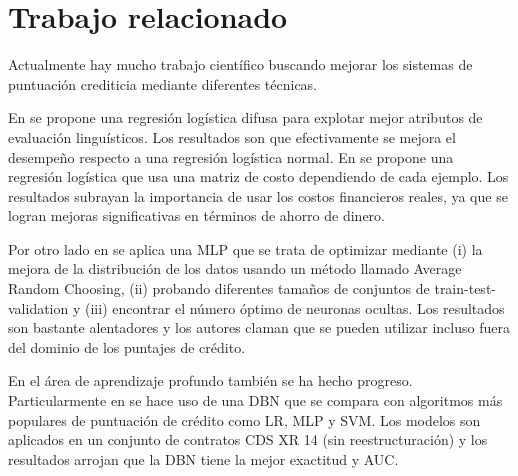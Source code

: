 
\section{Trabajo relacionado}

Actualmente hay mucho trabajo científico buscando mejorar los sistemas de puntuación crediticia mediante diferentes técnicas.

En \cite{sohn2016technology} se propone una regresión logística difusa para explotar mejor atributos de evaluación linguísticos. Los resultados son que efectivamente se mejora el desempeño respecto a una regresión logística normal. En \cite{bahnsen2014example} se propone una regresión logística que usa una matriz de costo dependiendo de cada ejemplo. Los resultados subrayan la importancia de usar los costos financieros reales, ya que se logran mejoras significativas en términos de ahorro de dinero.

Por otro lado en \cite{zhao2015investigation} se aplica una \ac{MLP} que se trata de optimizar mediante (i) la mejora de la distribución de los datos usando un método llamado Average Random Choosing, (ii) probando diferentes tamaños de conjuntos de train-test-validation y (iii) encontrar el número óptimo de neuronas ocultas. Los resultados son bastante alentadores y los autores claman que se pueden utilizar incluso fuera del dominio de los puntajes de crédito.

En el área de aprendizaje profundo también se ha hecho progreso. Particularmente en \cite{luo2017deep} se hace uso de una \ac{DBN} que se compara con algoritmos más populares de puntuación de crédito como \ac{LR}, \ac{MLP} y \ac{SVM}. Los modelos son aplicados en un conjunto de contratos CDS XR 14 (sin reestructuración) y los resultados arrojan que la \ac{DBN} tiene la mejor exactitud y AUC.

